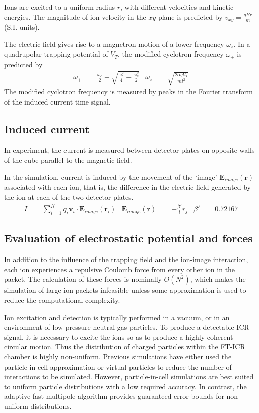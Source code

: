 \documentclass[10pt,conference,onecolumn]{IEEEtran}
\begin{document}
Ions are excited to a uniform radius $r$, with different velocities and kinetic energies.
The magnitude of ion velocity in the $xy$ plane is predicted by $v_{xy} = \frac{qBr}{m}$ (S.I. units).

The electric field gives rise to a magnetron motion of a lower frequency $\omega_z$.
In a quadrupolar trapping potential of $V_T$, the modified cyclotron frequency $\omega_+$ is predicted by
\begin{align}
\omega_+ &= \frac{\omega_c}{2} + \sqrt{\frac{\omega_c^2}{4} - \frac{\omega_z^2}{2}} &
\omega_z &= \sqrt{\frac{2 \alpha q V_T}{m l^2}}
\end{align}
The modified cyclotron frequency is measured by peaks in the Fourier transform of the induced current time signal.

\subsection{Induced current}

In experiment, the current is measured between detector plates on opposite walls of the cube parallel to the magnetic field.

In the simulation, current is induced by the movement of the `image' $\mathbf{E}_{image}(\mathbf{r})$ associated with each ion, that is, the difference in the electric field generated by the ion at each of the two detector plates\cite{Guan1995}.
\begin{align}
I &= \sum_{i=1}^N q_i\mathbf{v}_i \cdot \mathbf{E}_{image}(\mathbf{r}_i) & \mathbf{E}_{image}(\mathbf{r}) &= - \frac{\beta'}{l} r_j & \beta' &= 0.72167
\end{align}


\subsection{Evaluation of electrostatic potential and forces}

In addition to the influence of the trapping field and the ion-image interaction, each ion experiences a repulsive Coulomb force from every other ion in the packet.
The calculation of these forces is nominally $O(N^2)$, which makes the simulation of large ion packets infeasible unless some approximation is used to reduce the computational complexity.

Ion excitation and detection is typically performed in a vacuum, or in an environment of low-pressure neutral gas particles.
To produce a detectable ICR signal, it is necessary to excite the ions so as to produce a highly coherent circular motion.
Thus the distribution of charged particles within the FT-ICR chamber is highly non-uniform.
Previous simulations have either used the particle-in-cell approximation\cite{Leach2009} or virtual particles to reduce the number of interactions to be simulated\cite{Fujiwara2010}.
However, particle-in-cell simulations are best suited to uniform particle distributions with a low required accuracy\cite{Greengard1989}.
In contrast, the adaptive fast multipole algorithm\cite{Cheng1999} provides guaranteed error bounds for non-uniform distributions.
\end{document}
